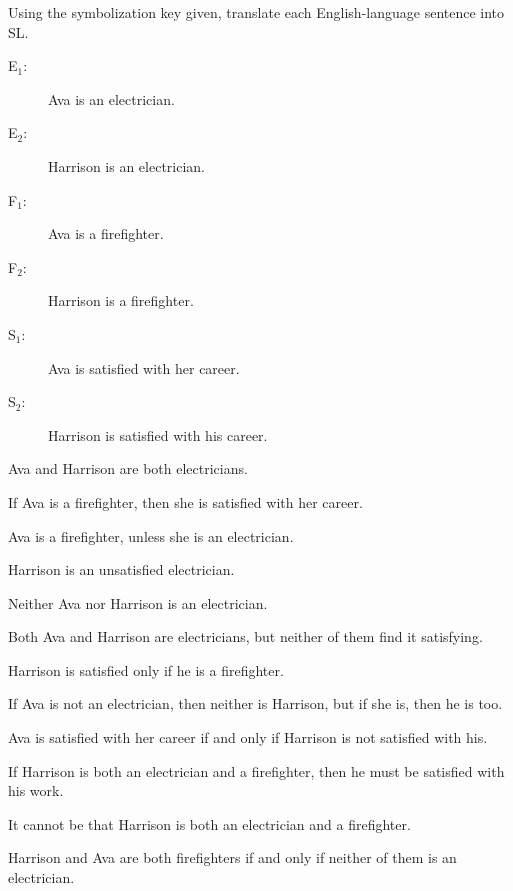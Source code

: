 


\noindent\problempart Using the symbolization key given, translate each English-language sentence into SL.
\label{pr.avacareer}
\begin{description}
\item[E$_1$:] Ava is an electrician.
\item[E$_2$:] Harrison is an electrician.
\item[F$_1$:] Ava is a firefighter.
\item[F$_2$:] Harrison is a firefighter.
\item[S$_1$:] Ava is satisfied with her career.
\item[S$_2$:] Harrison is satisfied with his career.
\end{description}
\begin{exercises}
\item Ava and Harrison are both electricians. 
\item If Ava is a firefighter, then she is satisfied with her career. 
\item Ava is a firefighter, unless she is an electrician. 
\item Harrison is an unsatisfied electrician. 
\item Neither Ava nor Harrison is an electrician. 
\item Both Ava and Harrison are electricians, but neither of them find it satisfying. 
\item Harrison is satisfied only if he is a firefighter. 
\item If Ava is not an electrician, then neither is Harrison, but if she is, then he is too. 
\item Ava is satisfied with her career if and only if Harrison is not satisfied with his. 
\item If Harrison is both an electrician and a firefighter, then he must be satisfied with his work. 
\item It cannot be that Harrison is both an electrician and a firefighter. 
\item Harrison and Ava are both firefighters if and only if neither of them is an electrician.  \vspace{1ex}
\end{exercises}

